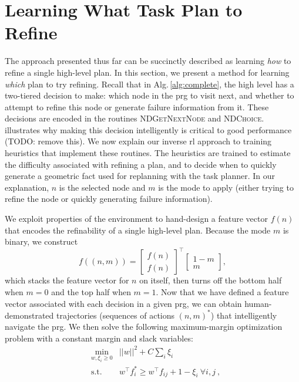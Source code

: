 \section{Learning What Task Plan to Refine}
The approach presented thus far can be succinctly described as learning \emph{how} to
refine a single high-level plan. In this section, we present a method for learning
\emph{which} plan to try refining. Recall that in Alg.\,\ref{alg:complete}, the high
level has a two-tiered decision to make: which node in the {\sc prg} to
visit next, and whether to attempt to refine this node or generate failure information
from it. These decisions are encoded in the routines \textsc{NDGetNextNode}
and \textsc{NDChoice}.  illustrates why making this decision intelligently is critical
to good performance (TODO: remove this). We now explain our inverse {\sc rl}
approach to training heuristics that implement these routines. The heuristics are trained to estimate
the difficulty associated with refining a plan, and to decide when to quickly generate
a geometric fact used for replanning with the task planner. In our explanation, $n$ is the selected
node and $m$ is the mode to apply (either trying to refine the node or quickly generating failure information).

We exploit properties of the environment to hand-design a feature vector $f(n)$ that encodes the refinability
of a single high-level plan. Because the mode $m$ is binary,
we construct $$f((n, m)) = \begin{bmatrix} f(n) \\ f(n) \end{bmatrix}^\top \begin{bmatrix} 1 - m \\ m \end{bmatrix},$$
which stacks the feature vector for $n$ on itself, then turns off the bottom half when $m = 0$ and the
top half when $m = 1$. Now that we have defined a feature vector associated with each decision in a given {\sc prg},
we can obtain human-demonstrated trajectories (sequences of actions $(n, m)^{*}$) that intelligently
navigate the {\sc prg}. We then solve the following maximum-margin optimization problem with a constant margin and slack variables:
\begin{align*}
&\min_{w, \xi_i \geq 0} & ||w||^2 + C \sum_i \xi_i\\
&\text{s.t.} & w^{\top}f^*_i \geq w^{\top}f_{ij} + 1 - \xi_{i}\ \forall i, j \ ,
\end{align*}

